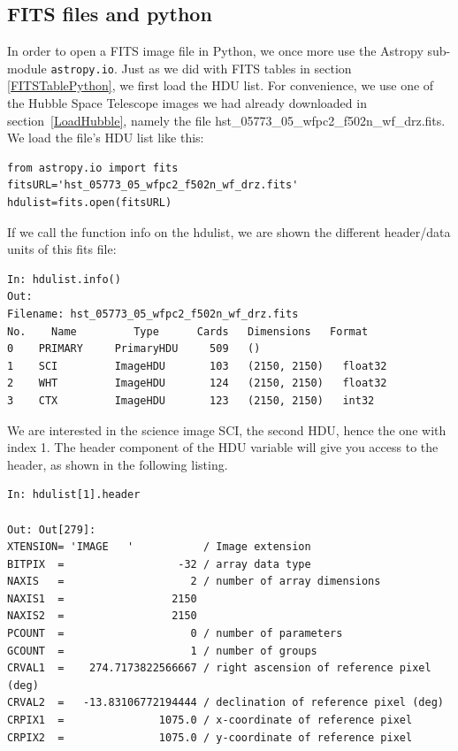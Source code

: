 \documentclass[twocolumn,apj]{openjournal}
\begin{document}
\subsection{FITS files and python}
In order to open a FITS image file in Python, we once more use the Astropy sub-module \verb|astropy.io|. Just as we did with FITS tables in section \ref{FITSTablePython}, we first load the HDU list. For convenience, we use one of the Hubble Space Telescope images we had already downloaded in section~\ref{LoadHubble}, namely the file hst\_05773\_05\_wfpc2\_f502n\_wf\_drz.fits. We load the file's HDU list like this: 
\begin{lstlisting}
from astropy.io import fits
fitsURL='hst_05773_05_wfpc2_f502n_wf_drz.fits'
hdulist=fits.open(fitsURL)
\end{lstlisting}
If we call the function info on the hdulist, we are shown the different header/data units of this fits file:
\begin{lstlisting}
In: hdulist.info()
Out:
Filename: hst_05773_05_wfpc2_f502n_wf_drz.fits
No.    Name         Type      Cards   Dimensions   Format
0    PRIMARY     PrimaryHDU     509   ()              
1    SCI         ImageHDU       103   (2150, 2150)   float32   
2    WHT         ImageHDU       124   (2150, 2150)   float32   
3    CTX         ImageHDU       123   (2150, 2150)   int32   
\end{lstlisting}
We are interested in the science image SCI, the second HDU, hence the one with index 1. The header component of the HDU variable will give you access to the header, as shown in the following listing.
\begin{lstlisting}
In: hdulist[1].header

Out: Out[279]: 
XTENSION= 'IMAGE   '           / Image extension                                
BITPIX  =                  -32 / array data type                                
NAXIS   =                    2 / number of array dimensions                     
NAXIS1  =                 2150                                                  
NAXIS2  =                 2150                                                  
PCOUNT  =                    0 / number of parameters                           
GCOUNT  =                    1 / number of groups                               
CRVAL1  =    274.7173822566667 / right ascension of reference pixel (deg)       
CRVAL2  =   -13.83106772194444 / declination of reference pixel (deg)           
CRPIX1  =               1075.0 / x-coordinate of reference pixel                
CRPIX2  =               1075.0 / y-coordinate of reference pixel  
\end{lstlisting}
\end{document}

